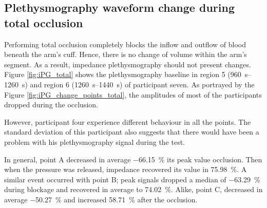\subsection{Plethysmography waveform change during total occlusion}
\label{section results 3.3}
Performing total occlusion completely blocks the inflow and outflow of blood beneath the arm's cuff.  Hence, there is no change of volume within the arm's segment. As a result, impedance plethysmography should not present changes.  Figure \ref{fig:iPG_total} shows the plethysmography baseline in region 5 (\SIrange{960}{1260}{\second}) and region 6  (\SIrange{1260}{1440}{\second}) of participant seven. As portrayed by the Figure \ref{fig:iPG_change_points_total}, the amplitudes of most of the participants dropped during the occlusion.

However, participant four experience different behaviour in all the points. The standard deviation of this participant also suggests that there would have been a problem with his plethysmography signal during the test. 

In general, point A decreased in average \SI{-66.15}{\percent} its peak value occlusion. Then when the pressure was released, impedance recovered its value in \SI{75.98}{\percent}. A similar event occurred with point B; peak signals dropped a median of \SI{-63.29}{\percent} during blockage and recovered in average to \SI{74.02}{\percent}. Alike, point C, decreased in average \SI{-50.27}{\percent}  and increased \SI{58.71}{\percent} after the occlusion.

